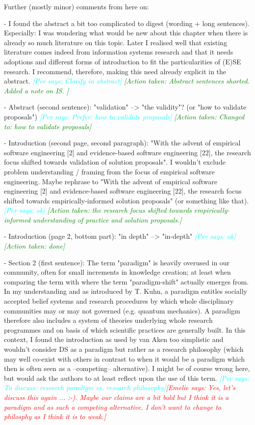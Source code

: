 \documentclass{article}
\newcommand{\emelie}[1]{\textcolor{red}{{\it [Emelie says: #1]}}}
\newcommand{\per}[1]{\textcolor{cyan}{{\it [Per says: #1]}}}
\newcommand{\action}[1]{\textcolor{green}{{\it [Action taken: #1]}}}
\newcommand{\emelie}[1]{}
\newcommand{\per}[1]{}
\newcommand{\action}[1]{}
\begin{document}
Further (mostly minor) comments from here on:

- I found the abstract a bit too complicated to digest (wording + long sentences). Especially: I was wondering what would be new about this chapter when there is already so much literature on this topic. Later I realised well that existing literature comes indeed from information systems research and that it needs adoptions and different forms of introduction to fit the particularities of (E)SE research. I recommend, therefore, making this need already explicit in the abstract. \per{Clarify in abstract} \action{Abstract sentences shorted. Added a note on IS. }

- Abstract (second sentence): "validation" --> "the validity"? (or "how to validate proposals") \per{Prefer: how to validate proposals} \action{Changed to: how to validate proposals}

- Introduction (second page, second paragraph): "With the advent of empirical software engineering [2] and evidence-based software engineering [22], the research focus shifted towards validation of solution proposals". I wouldn't exclude problem understanding / framing from the focus of empirical software engineering. Maybe rephrase to "With the advent of empirical software engineering [2] and evidence-based software engineering [22], the research focus shifted towards empirically-informed solution proposals" (or something like that). \per{ok} \action{ the research focus shifted towards  empirically-informed understanding of practice and solution proposals.}

- Introduction (page 2, bottom part): "in depth" --> "in-depth"  \per{ok} \action{done}


- Section 2 (first sentence): The term "paradigm" is heavily overused in our community, often for small increments in knowledge creation; at least when comparing the term with  where the term "paradigm-shift" actually emerges from. In my understanding and as introduced by T. Kuhn, a paradigm entitles socially accepted belief systems and research procedures by which whole disciplinary communities may or may not governed (e.g. quantum mechanics). A paradigm therefore also includes a system of theories underlying whole research programmes and on basis of which scientific practices are generally built. In this context, I found the introduction as used by van Aken too simplistic and wouldn't consider DS as a paradigm but rather as a research philosophy (which may well co-exist with others in contrast to when it would be a paradigm which then is often seen as a --competing-- alternative). I might be of course wrong here, but would ask the authors to at least reflect upon the use of this term. \per{To discuss: research paradigm vs. research philosophy}\emelie{Yes, let's discuss this again ... :-). Maybe our claims are a bit bold but I think it is a paradigm and as such a competing alternative. I don't want to change to philosphy as I think it is to weak.}
\end{document}
